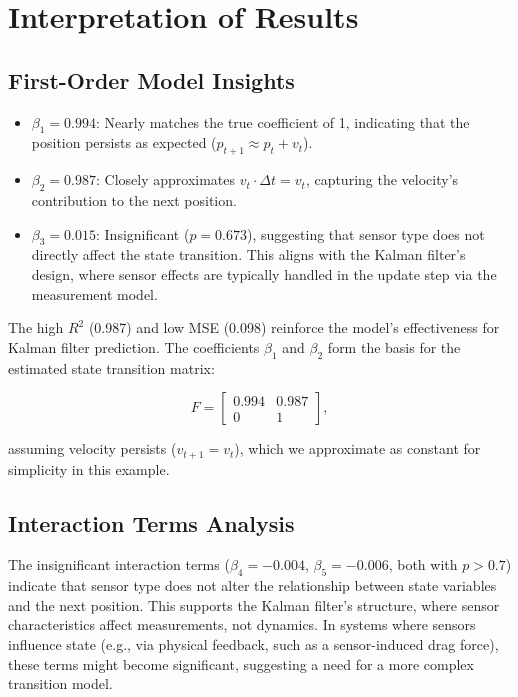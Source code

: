 \documentclass[12pt]{article}
\begin{document}
\section{Interpretation of Results}
\label{sec:interpretation}

\subsection{First-Order Model Insights}
\label{subsec:first_order_insights}

\begin{itemize}
    \item \( \beta_1 = 0.994 \): Nearly matches the true coefficient of 1, indicating that the position persists as expected (\( p_{t+1} \approx p_t + v_t \)).
    \item \( \beta_2 = 0.987 \): Closely approximates \( v_t \cdot \Delta t = v_t \), capturing the velocity’s contribution to the next position.
    \item \( \beta_3 = 0.015 \): Insignificant (\( p = 0.673 \)), suggesting that sensor type does not directly affect the state transition. This aligns with the Kalman filter’s design, where sensor effects are typically handled in the update step via the measurement model.
\end{itemize}

The high \( R^2 \) (0.987) and low MSE (0.098) reinforce the model’s effectiveness for Kalman filter prediction. The coefficients \( \beta_1 \) and \( \beta_2 \) form the basis for the estimated state transition matrix:

\begin{equation}
    F = \begin{bmatrix} 0.994 & 0.987 \\ 0 & 1 \end{bmatrix},
    \label{eq:estimated_F}
\end{equation}

assuming velocity persists (\( v_{t+1} = v_t \)), which we approximate as constant for simplicity in this example.

\subsection{Interaction Terms Analysis}
\label{subsec:interaction_analysis}

The insignificant interaction terms (\( \beta_4 = -0.004 \), \( \beta_5 = -0.006 \), both with \( p > 0.7 \)) indicate that sensor type does not alter the relationship between state variables and the next position. This supports the Kalman filter’s structure, where sensor characteristics affect measurements, not dynamics. In systems where sensors influence state (e.g., via physical feedback, such as a sensor-induced drag force), these terms might become significant, suggesting a need for a more complex transition model.
\end{document}
